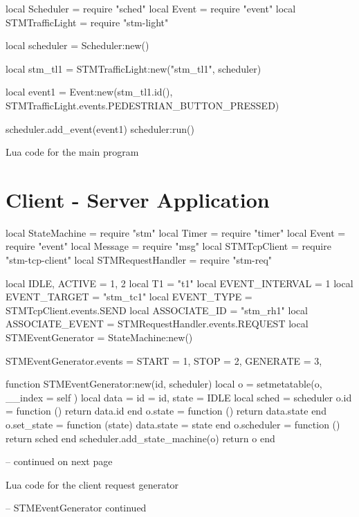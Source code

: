 \begin{appendices}
\begin{listing}[htp]
\begin{luacode}
local Scheduler = require "sched"
local Event = require "event"
local STMTrafficLight = require "stm-light"

local scheduler = Scheduler:new()

local stm_tl1 = STMTrafficLight:new("stm_tl1", scheduler)

local event1 = Event:new(stm_tl1.id(), STMTrafficLight.events.PEDESTRIAN_BUTTON_PRESSED)

scheduler.add_event(event1)
scheduler:run()	
\end{luacode}
	\caption{Lua code for the main program}
	\label{code:main}
\end{listing}

\FloatBarrier
\section{Client - Server Application}

\begin{listing}[htp]
\begin{luacode}
local StateMachine = require "stm"
local Timer = require "timer"
local Event = require "event"
local Message = require "msg"
local STMTcpClient = require "stm-tcp-client"
local STMRequestHandler = require "stm-req"

local IDLE, ACTIVE  = 1, 2
local T1 = "t1"
local EVENT_INTERVAL = 1
local EVENT_TARGET = "stm_tc1"
local EVENT_TYPE = STMTcpClient.events.SEND
local ASSOCIATE_ID = "stm_rh1"
local ASSOCIATE_EVENT = STMRequestHandler.events.REQUEST
local STMEventGenerator = StateMachine:new()

STMEventGenerator.events = {START = 1, STOP = 2, GENERATE = 3,}

function STMEventGenerator:new(id, scheduler)
	local o = {}
	setmetatable(o, { __index = self })
	local data = {id = id, state = IDLE}
	local sched = scheduler
	o.id = function ()
		return data.id
	end
	o.state = function ()
		return data.state
	end
	o.set_state = function (state)
		data.state = state
	end
	o.scheduler = function ()
		return sched
	end
	scheduler.add_state_machine(o)
	return o
end

-- continued on next page
\end{luacode}
	\caption{Lua code for the client request generator}
	\label{code:event_gen}
\end{listing}


\begin{listing}[htp]
\begin{luacode}
-- STMEventGenerator continued


\end{luacode}
\end{listing}
\end{appendices}
